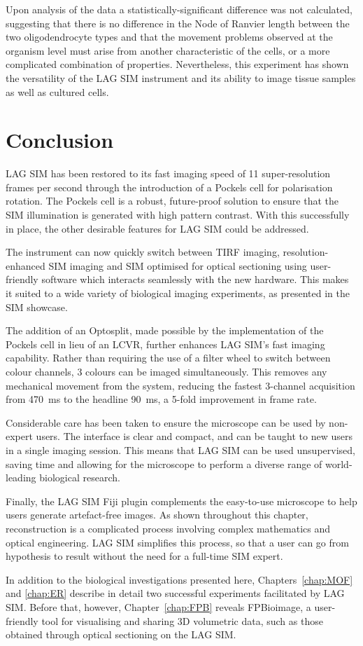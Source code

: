 Upon analysis of the data a statistically-significant difference was not calculated, suggesting that there is no difference in the Node of Ranvier length between the two oligodendrocyte types and that the movement problems observed at the organism level must arise from another characteristic of the cells, or a more complicated combination of properties. 
Nevertheless, this experiment has shown the versatility of the LAG SIM instrument and its ability to image tissue samples as well as cultured cells. 

\section{Conclusion}
LAG SIM has been restored to its fast imaging speed of 11 super-resolution frames per second through the introduction of a Pockels cell for polarisation rotation. 
The Pockels cell is a robust, future-proof solution to ensure that the SIM illumination is generated with high pattern contrast. 
With this successfully in place, the other desirable features for LAG SIM could be addressed. 

The instrument can now quickly switch between TIRF imaging, resolution-enhanced SIM imaging and SIM optimised for optical sectioning using user-friendly software which interacts seamlessly with the new hardware. 
This makes it suited to a wide variety of biological imaging experiments, as presented in the SIM showcase. 

The addition of an Optosplit, made possible by the implementation of the Pockels cell in lieu of an LCVR, further enhances LAG SIM's fast imaging capability. 
Rather than requiring the use of a filter wheel to switch between colour channels, 3 colours can be imaged simultaneously. 
This removes any mechanical movement from the system, reducing the fastest 3-channel acquisition from \SI{470}{\milli\second} to the headline \SI{90}{\milli\second}, a 5-fold improvement in frame rate. 

Considerable care has been taken to ensure the microscope can be used by non-expert users. 
The interface is clear and compact, and can be taught to new users in a single imaging session. 
This means that LAG SIM can be used unsupervised, saving time and allowing for the microscope to perform a diverse range of world-leading biological research.

Finally, the LAG SIM Fiji plugin complements the easy-to-use microscope to help users generate artefact-free images. 
As shown throughout this chapter, reconstruction is a complicated process involving complex mathematics and optical engineering. 
LAG SIM simplifies this process, so that a user can go from hypothesis to result without the need for a full-time SIM expert. 

In addition to the biological investigations presented here, Chapters~\ref{chap:MOF} and \ref{chap:ER} describe in detail two successful experiments facilitated by LAG SIM. 
Before that, however, Chapter~\ref{chap:FPB} reveals FPBioimage, a user-friendly tool for visualising and sharing 3D volumetric data, such as those obtained through optical sectioning on the LAG SIM. 